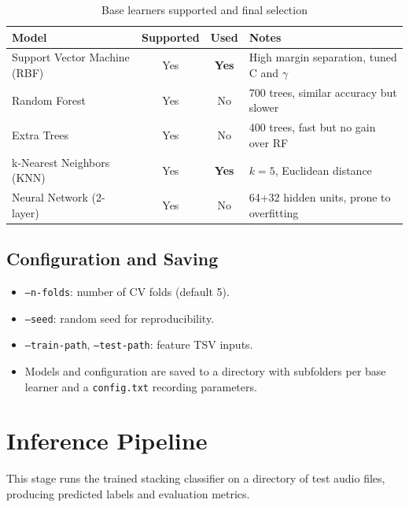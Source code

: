 \documentclass[a4paper,12pt]{article}
\begin{document}
\begin{table}[H]
\centering
\begin{tabular}{|l|c|c|l|}
\hline
\textbf{Model} & \textbf{Supported} & \textbf{Used} & \textbf{Notes} \\
\hline
Support Vector Machine (RBF) & Yes & \textbf{Yes}  & High margin separation, tuned C and $\gamma$ \\
Random Forest                & Yes & No            & 700 trees, similar accuracy but slower \\
Extra Trees                  & Yes & No            & 400 trees, fast but no gain over RF \\
k-Nearest Neighbors (KNN)    & Yes & \textbf{Yes}  & \(k=5\), Euclidean distance \\
Neural Network (2-layer)     & Yes & No            & 64+32 hidden units, prone to overfitting \\
\hline
\end{tabular}
\caption{Base learners supported and final selection}
\label{tab:base-models}
\end{table}

\subsection{Configuration and Saving}
\begin{itemize}
  \item \texttt{--n-folds}: number of CV folds (default 5).
  \item \texttt{--seed}: random seed for reproducibility.
  \item \texttt{--train-path}, \texttt{--test-path}: feature TSV inputs.
  \item Models and configuration are saved to a directory with subfolders per base learner and a \texttt{config.txt} recording parameters.
\end{itemize}

\newpage
\section{Inference Pipeline}
\label{sec:inference}

This stage runs the trained stacking classifier on a directory of test audio files, producing predicted labels and evaluation metrics.
\end{document}

